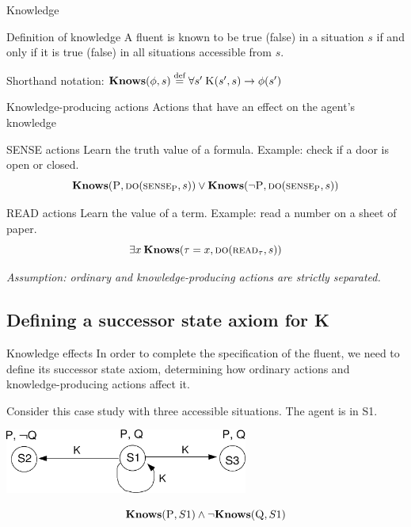 \begin{frame}{Knowledge}
    \begin{block}{Definition of knowledge}
        A fluent is known to be true (false) in a situation \(s\)
        if and only if it is true (false)
        in all situations accessible from \(s\).
    \end{block}

    Shorthand notation: \( \textbf{Knows}(\phi, s) \stackrel{\text{def}}{=} \forall s' \: \textsc{K}(s',s) \rightarrow \phi(s') \)
\end{frame}

\begin{frame}{Knowledge-producing actions}
    Actions that have an effect on the agent's knowledge

    \begin{block}{SENSE actions}
        Learn the truth value of a formula. Example: check if a door is open or closed.
        \[
            \textbf{Knows}(\textsc{P}, \textsc{do}(\textsc{sense}_{\textsc{P}}, s))
            \lor
            \textbf{Knows}(\lnot \textsc{P}, \textsc{do}(\textsc{sense}_{\textsc{P}}, s))
        \]
    \end{block}

    \begin{block}{READ actions}
        Learn the value of a term. Example: read a number on a sheet of paper.
        \[
            \exists x \: \textbf{Knows}(\tau = x, \textsc{do}(\textsc{read}_\tau, s))
        \]
    \end{block}

    \emph{Assumption: ordinary and knowledge-producing actions are strictly separated.}
\end{frame}

\subsection{Defining a successor state axiom for K}

\begin{frame}{Knowledge effects}
    In order to complete the specification of the \sck{} fluent,
    we need to define its successor state axiom,
    determining how ordinary actions and knowledge-producing actions affect it.

    Consider this case study with three accessible situations. The agent is in S1.

    \begin{center}
        \includegraphics[width=0.6\textwidth]{assets/3states_noactions.png}
    \end{center}

    \[ \textbf{Knows}(\textsc{P}, S1) \land \lnot \textbf{Knows}(\textsc{Q}, S1) \]
\end{frame}

